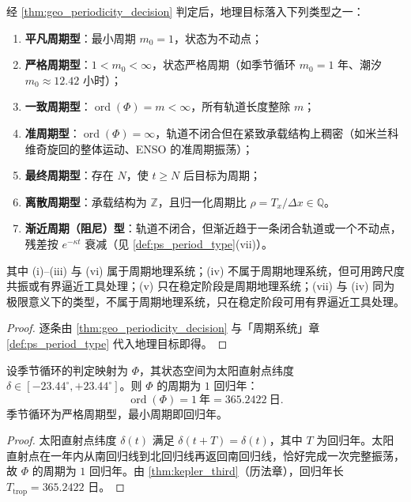 \begin{corollary}[地理周期类型]\label{cor:geo_period_type}
经 \cref{thm:geo_periodicity_decision} 判定后，地理目标落入下列类型之一：
\begin{enumerate}[label=(\roman*)]
    \item \textbf{平凡周期型}：最小周期 $m_0=1$，状态为不动点；
    \item \textbf{严格周期型}：$1<m_0<\infty$，状态严格周期（如季节循环 $m_0=1$ 年、潮汐 $m_0\approx 12.42$ 小时）；
    \item \textbf{一致周期型}：$\operatorname{ord}(\Phi)=m<\infty$，所有轨道长度整除 $m$；
    \item \textbf{准周期型}：$\operatorname{ord}(\Phi)=\infty$，轨道不闭合但在紧致承载结构上稠密（如米兰科维奇旋回的整体运动、ENSO 的准周期振荡）；
    \item \textbf{最终周期型}：存在 $N$，使 $t\ge N$ 后目标为周期；
    \item \textbf{离散周期型}：承载结构为 $\mathbb Z$，且归一化周期比 $\rho=T_x/\Delta x\in\mathbb Q$。
    \item \textbf{渐近周期（阻尼）型}：轨道不闭合，但渐近趋于一条闭合轨道或一个不动点，残差按 $e^{-\kappa t}$ 衰减（见 \cref{def:ps_period_type}(vii)）。
\end{enumerate}
其中 (i)--(iii) 与 (vi) 属于周期地理系统；(iv) 不属于周期地理系统，但可用跨尺度共振或有界逼近工具处理；(v) 只在稳定阶段是周期地理系统；(vii) 与 (iv) 同为极限意义下的类型，不属于周期地理系统，只在稳定阶段可用有界逼近工具处理。
\end{corollary}

\begin{proof}
逐条由 \cref{thm:geo_periodicity_decision} 与「周期系统」章 \cref{def:ps_period_type} 代入地理目标即得。
\end{proof}

\begin{lemma}[季节循环的周期判定]\label{lem:geo_seasonal_period}
设季节循环的判定映射为 $\Phi$，其状态空间为太阳直射点纬度 $\delta\in[-23.44^\circ,+23.44^\circ]$。则 $\Phi$ 的周期为 $1$ 回归年：
\[
\operatorname{ord}(\Phi)=1\ \text{年}=365.2422\ \text{日}.
\]
季节循环为严格周期型，最小周期即回归年。
\end{lemma}

\begin{proof}
太阳直射点纬度 $\delta(t)$ 满足 $\delta(t+T)=\delta(t)$，其中 $T$ 为回归年。太阳直射点在一年内从南回归线到北回归线再返回南回归线，恰好完成一次完整振荡，故 $\Phi$ 的周期为 $1$ 回归年。由 \cref{thm:kepler_third}（历法章），回归年长 $T_{\text{trop}}=365.2422$ 日。
\end{proof}

